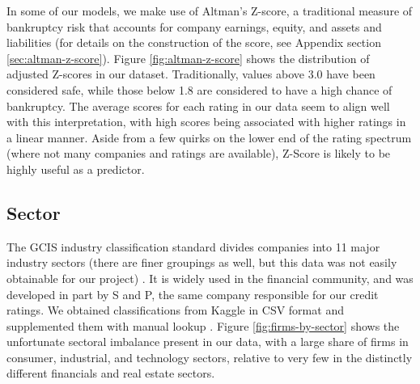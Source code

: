 \documentclass{article}[11pt]
\begin{document}
    In some of our models, we make use of Altman's Z-score, a traditional measure of bankruptcy risk that accounts for company earnings, equity, and assets and liabilities \citep{altman_financial_1968} (for details on the construction of the score, see Appendix section \ref{sec:altman-z-score}). Figure \ref{fig:altman-z-score} shows the distribution of adjusted Z-scores in our dataset. Traditionally, values above 3.0 have been considered safe, while those below 1.8 are considered to have a high chance of bankruptcy. The average scores for each rating in our data seem to align well with this interpretation, with high scores being associated with higher ratings in a linear manner. Aside from a few quirks on the lower end of the rating spectrum (where not many companies and ratings are available), Z-Score is likely to be highly useful as a predictor.
      
    \subsection*{Sector}

    The GCIS industry classification standard divides companies into 11 major industry sectors (there are finer groupings as well, but this data was not easily obtainable for our project) \citep{s_and_p_gics_2024}. It is widely used in the financial community, and was developed in part by S and P, the same company responsible for our credit ratings. We obtained classifications from Kaggle in CSV format and supplemented them with manual lookup \citep{kozlov_us_2022}. Figure \ref{fig:firms-by-sector} shows the unfortunate sectoral imbalance present in our data, with a large share of firms in consumer, industrial, and technology sectors, relative to very few in the distinctly different financials and real estate sectors.
\end{document}
